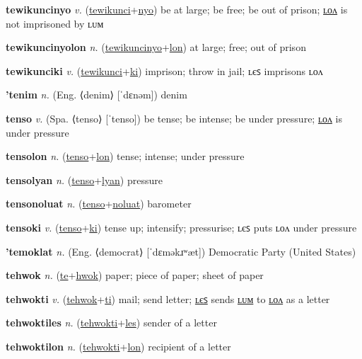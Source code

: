 \textbf{\hypertarget{tewikuncinyo}{tewikuncinyo}} \textit{v.} (\hyperlink{tewikunci}{tewikunci}+\allowbreak \hyperlink{nyo}{nyo})
be at large; be free; be out of prison; \hyperlink{tewikuncinyolon}{ʟᴏᴧ} is not imprisoned by ʟᴜᴍ

\textbf{\hypertarget{tewikuncinyolon}{tewikuncinyolon}} \textit{n.} (\hyperlink{tewikuncinyo}{tewikuncinyo}+\allowbreak \hyperlink{lon}{lon})
at large; free; out of prison

\textbf{\hypertarget{tewikunciki}{tewikunciki}} \textit{v.} (\hyperlink{tewikunci}{tewikunci}+\allowbreak \hyperlink{ki}{ki})
imprison; throw in jail; ʟєꜱ imprisons ʟᴏᴧ

\textbf{\hypertarget{'tenim}{'tenim}} \textit{n.} (Eng. ⟨denim⟩ [ˈdɛnəm])
denim

\textbf{\hypertarget{tenso}{tenso}} \textit{v.} (Spa. ⟨tenso⟩ [ˈtenso])
be tense; be intense; be under pressure; \hyperlink{tensolon}{ʟᴏᴧ} is under pressure

\textbf{\hypertarget{tensolon}{tensolon}} \textit{n.} (\hyperlink{tenso}{tenso}+\allowbreak \hyperlink{lon}{lon})
tense; intense; under pressure

\textbf{\hypertarget{tensolyan}{tensolyan}} \textit{n.} (\hyperlink{tenso}{tenso}+\allowbreak \hyperlink{lyan}{lyan})
pressure

\textbf{\hypertarget{tensonoluat}{tensonoluat}} \textit{n.} (\hyperlink{tenso}{tenso}+\allowbreak \hyperlink{noluat}{noluat})
barometer

\textbf{\hypertarget{tensoki}{tensoki}} \textit{v.} (\hyperlink{tenso}{tenso}+\allowbreak \hyperlink{ki}{ki})
tense up; intensify; pressurise; ʟєꜱ puts ʟᴏᴧ under pressure

\textbf{\hypertarget{'temoklat}{'temoklat}} \textit{n.} (Eng. ⟨democrat⟩ [ˈdɛməkɹʷæt])
Democratic Party (United States)

\textbf{\hypertarget{tehwok}{tehwok}} \textit{n.} (\hyperlink{te}{te}+\allowbreak \hyperlink{hwok}{hwok})
paper; piece of paper; sheet of paper

\textbf{\hypertarget{tehwokti}{tehwokti}} \textit{v.} (\hyperlink{tehwok}{tehwok}+\allowbreak \hyperlink{ti}{ti})
mail; send letter; \hyperlink{tehwoktiles}{ʟєꜱ} sends \hyperlink{tehwoktilum}{ʟᴜᴍ} to \hyperlink{tehwoktilon}{ʟᴏᴧ} as a letter

\textbf{\hypertarget{tehwoktiles}{tehwoktiles}} \textit{n.} (\hyperlink{tehwokti}{tehwokti}+\allowbreak \hyperlink{les}{les})
sender of a letter

\textbf{\hypertarget{tehwoktilon}{tehwoktilon}} \textit{n.} (\hyperlink{tehwokti}{tehwokti}+\allowbreak \hyperlink{lon}{lon})
recipient of a letter

